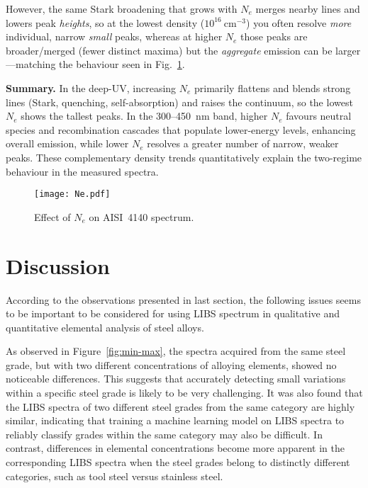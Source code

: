\documentclass[12pt,a4paper]{article}
\begin{document}
	 However, the same Stark broadening that grows with \(N_e\) merges nearby lines and lowers peak \emph{heights}, so at the lowest density (\(10^{16}~\mathrm{cm^{-3}}\)) you often resolve \emph{more} individual, narrow \emph{small} peaks, whereas at higher \(N_e\) those peaks are broader/merged (fewer distinct maxima) but the \emph{aggregate} emission can be larger—matching the behaviour seen in Fig.~\ref{fig:Effect of N_e}.
	 
	 \medskip
	 \textbf{Summary.} In the deep-UV, increasing \(N_e\) primarily flattens and blends strong lines (Stark, quenching, self-absorption) and raises the continuum, so the lowest \(N_e\) shows the tallest peaks. In the 300–450~nm band, higher \(N_e\) favours neutral species and recombination cascades that populate lower-energy levels, enhancing overall emission, while lower \(N_e\) resolves a greater number of narrow, weaker peaks. These complementary density trends quantitatively explain the two-regime behaviour in the measured spectra.
	 
	
		
	
	\begin{figure}[h!]
		\centering
		\texttt{[image: Ne.pdf]}
		\caption{Effect of $N_e$ on AISI~4140 spectrum.}
		\label{fig:Effect of N_e}
	\end{figure}

	
	\section{Discussion}
	According to the observations presented in last section, the following issues seems to be important to be considered for using LIBS spectrum in qualitative and quantitative elemental analysis of steel alloys. 
	
	As observed in Figure~\ref{fig:min-max}, the spectra acquired from the same steel grade, but with two different concentrations of alloying elements, showed no noticeable differences. This suggests that accurately detecting small variations within a specific steel grade is likely to be very challenging. It was also found that the LIBS spectra of two different steel grades from the same category are highly similar, indicating that training a machine learning model on LIBS spectra to reliably classify grades within the same category may also be difficult. In contrast, differences in elemental concentrations become more apparent in the corresponding LIBS spectra when the steel grades belong to distinctly different categories, such as tool steel versus stainless steel.
	
\end{document}
